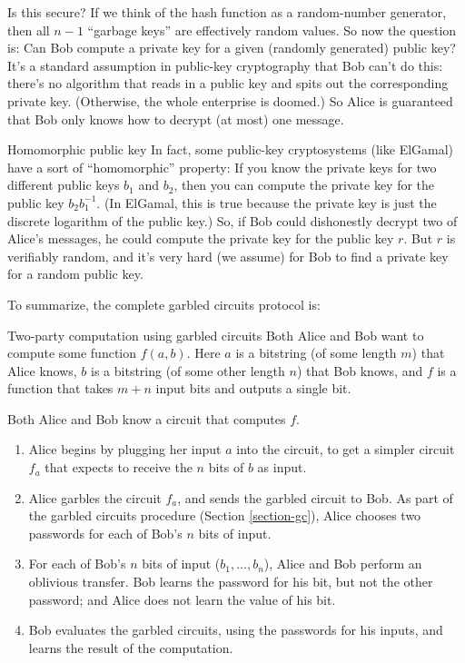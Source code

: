 Is this secure? If we think of the hash function as a random-number
generator, then all $n - 1$ ``garbage keys'' are effectively random
values. So now the question is: Can Bob compute a private key for a
given (randomly generated) public key? It's a standard assumption in
public-key cryptography that Bob can't do this: there's no algorithm
that reads in a public key and spits out the corresponding private key.
(Otherwise, the whole enterprise is doomed.) So Alice is guaranteed that
Bob only knows how to decrypt (at most) one message.

\begin{remark}{Homomorphic public key}{}
In fact, some public-key cryptosystems (like ElGamal) have a sort of
``homomorphic'' property: If you know the private keys for two different
public keys $b_{1}$ and $b_{2}$, then you can compute the private
key for the public key $b_{2}b_{1}^{- 1}$. (In ElGamal, this is true
because the private key is just the discrete logarithm of the public
key.) So, if Bob could dishonestly decrypt two of Alice's messages, he
could compute the private key for the public key $r$. But $r$ is
verifiably random, and it's very hard (we assume) for Bob to find a
private key for a random public key.
\end{remark}

To summarize, the complete garbled circuits protocol is:

\begin{algo}{Two-party computation using garbled circuits}{}
Both Alice and Bob want to compute some function $f(a, b)$.
Here $a$ is a bitstring (of some length $m$) that Alice knows,
$b$ is a bitstring (of some other length $n$) that Bob knows,
and $f$ is a function that takes $m+n$ input bits and outputs a single bit.

Both Alice and Bob know a circuit that computes $f$.
\begin{enumerate}
\item Alice begins by plugging her input $a$ into the circuit, to get a simpler circuit $f_a$ that expects to receive the $n$ bits of $b$ as input.
\item Alice garbles the circuit $f_a$, and sends the garbled circuit to Bob.  As part of the garbled circuits procedure (Section \ref{section-gc}), Alice chooses two passwords for each of Bob's $n$ bits of input.
\item For each of Bob's $n$ bits of input ($b_1, \ldots, b_n$), Alice and Bob perform an oblivious transfer.  Bob learns the password for his bit, but not the other password; and Alice does not learn the value of his bit.
\item Bob evaluates the garbled circuits, using the passwords for his inputs, and learns the result of the computation.
\end{enumerate}
\end{algo}
